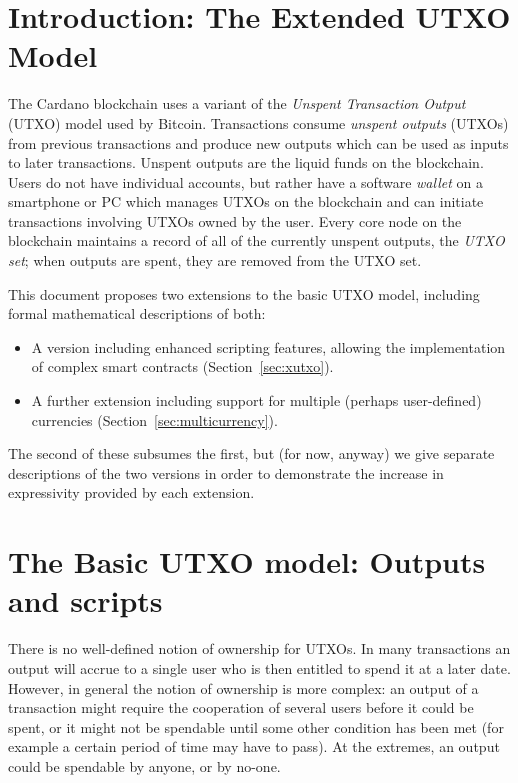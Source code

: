 \documentclass[a4paper]{article}
\theoremstyle{definition}  %
\begin{document}
\maketitle

\section{Introduction: The Extended UTXO Model}
\label{sec:intro}
The Cardano blockchain uses a variant of the \textit{Unspent
  Transaction Output} (UTXO) model used by Bitcoin.  Transactions
consume \textit{unspent outputs} (UTXOs) from previous transactions
and produce new outputs which can be used as inputs to later
transactions.  Unspent outputs are the liquid funds on the
blockchain. Users do not have individual accounts, but rather have a
software \textit{wallet} on a smartphone or PC which manages UTXOs on
the blockchain and can initiate transactions involving UTXOs owned by
the user.  Every core node on the blockchain maintains a record of all
of the currently unspent outputs, the \textit{UTXO set}; when outputs
are spent, they are removed from the UTXO set.

This document proposes two extensions to the basic UTXO model, including
formal mathematical descriptions of both:
\begin{itemize}
\item A version including enhanced scripting features, allowing the
  implementation of complex smart contracts (Section~\ref{sec:xutxo}).
\item A further extension including support for multiple (perhaps user-defined)
  currencies (Section~\ref{sec:multicurrency}).
\end{itemize}

\noindent The second of these subsumes the first, but (for now, anyway) we give
separate descriptions of the two versions in order to demonstrate the
increase in expressivity provided by each extension.

\section{The Basic UTXO model: Outputs and scripts}
\label{sec:utxo-intro}

There is no well-defined notion of ownership for UTXOs.  In many
transactions an output will accrue to a single user who is then
entitled to spend it at a later date.  However, in general the notion
of ownership is more complex: an output of a transaction might require
the cooperation of several users before it could be spent, or it might
not be spendable until some other condition has been met (for example
a certain period of time may have to pass).  At the extremes, an
output could be spendable by anyone, or by no-one.
\end{document}
